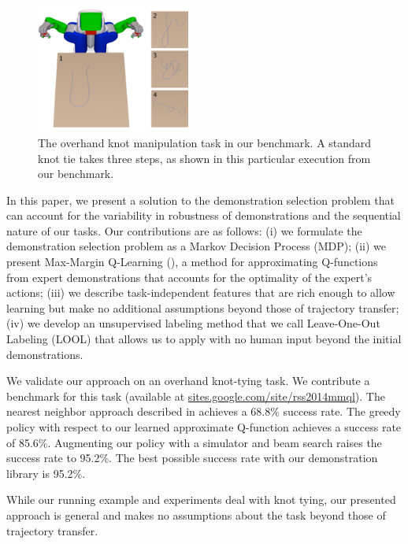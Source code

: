 \begin{figure}[t]
  \centering
    \noindent
    \includegraphics[width=0.45\textwidth]{figures/knot_steps_num.png}
  \caption{The overhand knot manipulation task in our benchmark.
           A standard knot tie takes three steps, as shown in this
           particular execution from our benchmark.}
  \label{fig:knot_steps}
\end{figure}

In this paper, we present a solution to the demonstration selection problem that
can account for the variability in robustness of demonstrations and the
sequential nature of our tasks. Our contributions are as follows:
(i) we formulate the demonstration selection problem as a Markov Decision
Process (MDP); (ii) we present Max-Margin Q-Learning (\mmql{}), a method for
approximating Q-functions from expert demonstrations that accounts for the
optimality of the expert's actions; (iii) we describe task-independent
features that are rich enough to allow learning but make no additional
assumptions beyond those of trajectory transfer; (iv) we develop an unsupervised
labeling method that we call Leave-One-Out Labeling (LOOL) that allows
us to apply \mmql{} with no human input beyond the initial demonstrations.

We validate our approach on an overhand knot-tying task. We contribute a
benchmark for this task (available at \href{https://sites.google.com/site/rss2014mmql}{sites.google.com/site/rss2014mmql}). The nearest
neighbor approach described in \citet{Schulmanetal_ISRR2013} achieves a
68.8\% success rate. The greedy policy with respect to our learned
approximate Q-function achieves a success rate of 85.6\%. Augmenting our
policy with a simulator and beam search raises the success rate to 95.2\%.
The best possible success rate with our demonstration library is 95.2\%.

While our running example and experiments deal with knot tying, our presented
\mmql{} approach is general and makes no assumptions about the task
beyond those of trajectory transfer.
